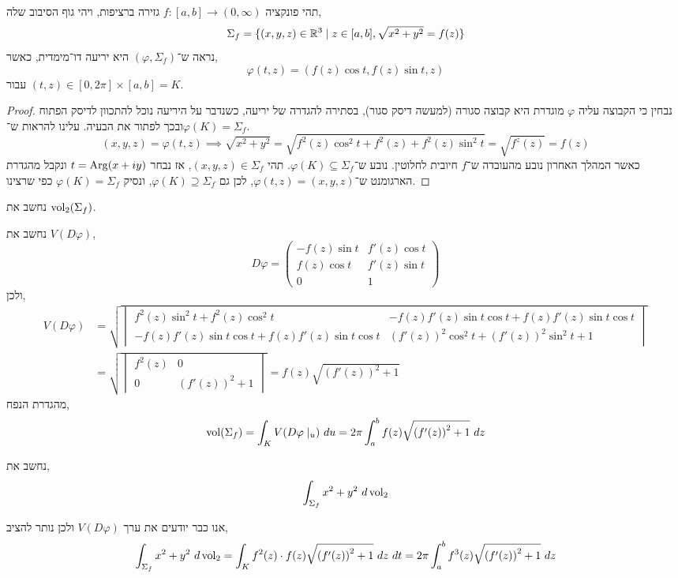 \question{}
\subquestion{}
תהי פונקציה $f : [a, b] \to (0, \infty)$ גזירה ברציפות, ויהי גוף הסיבוב שלה,
\[
	\Sigma_f
	= \{ (x, y, z) \in \mathbb{R}^3 \mid z \in [a, b], \sqrt{x^2 + y^2} = f(z) \}
\]
נראה ש־$(\varphi, \Sigma_f)$ היא יריעה דו־מימדית, כאשר,
\[
	\varphi(t, z)
	= (f(z) \cos t, f(z) \sin t, z)
\]
עבור $(t, z) \in [0, 2\pi] \times [a, b] = K$.
\begin{proof}
	נבחין כי הקבוצה עליה $\varphi$ מוגדרת היא קבוצה סגורה (למעשה דיסק סגור), בסתירה להגדרה של יריעה, כשנדבר על היריעה נוכל להתכוון לדיסק הפתוח ובכך לפתור את הבעיה.
	עלינו להראות ש־$\varphi(K) = \Sigma_f$.
	\[
		(x, y, z) = \varphi(t, z)
		\implies \sqrt{x^2 + y^2}
		= \sqrt{f^2(z) \cos^2 t + f^2(z) + f^2(z) \sin^2 t}
		= \sqrt{f^z(z)}
		= f(z)
	\]
	כאשר המהלך האחרון נובע מהעובדה ש־$f$ חיובית לחלוטין.
	נובע ש־$\varphi(K) \subseteq \Sigma_f$.
	תהי $(x, y, z) \in \Sigma_f$, אז נבחר $t = \operatorname{Arg}(x + iy)$ ונקבל מהגדרת הארגומנט ש־$\varphi(t, z) = (x, y, z)$, לכן גם $\varphi(K) \supseteq \Sigma_f$, ונסיק $\varphi(K) = \Sigma_f$ כפי שרצינו.
\end{proof}
נחשב את $\operatorname{vol}_2(\Sigma_f)$.
\begin{solution}
	נחשב את $V(D\varphi)$,
	\[
		D\varphi
		= \begin{pmatrix}
			- f(z) \sin t & f'(z) \cos t \\
			f(z) \cos t & f'(z) \sin t \\
			0 & 1
		\end{pmatrix} 
	\]
	ולכן,
	\begin{align*}
		V(D\varphi)
		& = \sqrt{\begin{vmatrix}
				f^2(z) \sin^2 t + f^2(z) \cos^2 t & -f(z) f'(z) \sin t \cos t + f(z) f'(z) \sin t \cos t \\
				-f(z) f'(z) \sin t \cos t + f(z) f'(z) \sin t \cos t & {(f'(z))}^2 \cos^2 t + {(f'(z))}^2 \sin^2 t + 1
		\end{vmatrix}} \\
		& = \sqrt{\begin{vmatrix}
				f^2(z) & 0 \\
				0 & {(f'(z))}^2 + 1
		\end{vmatrix}}
		= f(z) \sqrt{{(f'(z))}^2 + 1}
	\end{align*}
	מהגדרת הנפח,
	\[
		\operatorname{vol}(\Sigma_f)
		= \int_K V(D \varphi \mid_u)\ du
		= 2\pi \int_a^b f(z) \sqrt{{(f'(z))}^2 + 1}\ dz
	\]
\end{solution}

\subquestion{}
נחשב את,
\[
	\int_{\Sigma_f} x^2 + y^2\ d\vol_2
\]
\begin{solution}
	אנו כבר יודעים את ערך $V(D \varphi)$ ולכן נותר להציב,
	\[
		\int_{\Sigma_f} x^2 + y^2\ d\vol_2
		= \int_K f^2(z) \cdot f(z) \sqrt{{(f'(z))}^2 + 1}\ dz\ dt
		= 2\pi \int_a^b f^3(z) \sqrt{{(f'(z))}^2 + 1}\ dz
	\]
\end{solution}

